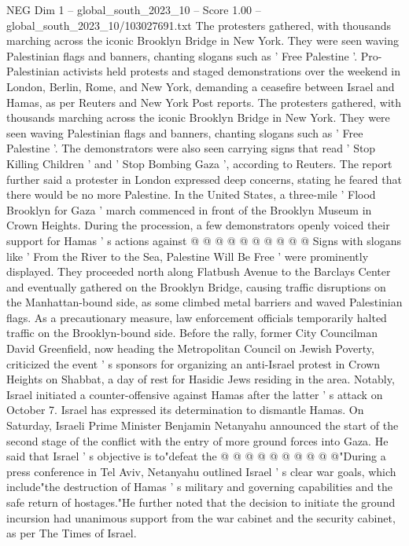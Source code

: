 \begin{textsample}{NEG Dim 1 – global\_south\_2023\_10 – Score 1.00 – global\_south\_2023\_10/103027691.txt}  \label{ex:f1_neg_406}
The protesters gathered, with thousands marching across the iconic Brooklyn Bridge in New York.
They were seen waving Palestinian flags and banners, chanting slogans such as ' Free Palestine '.
Pro-Palestinian activists held protests and staged demonstrations over the weekend in London, Berlin, Rome, and New York, demanding a ceasefire between Israel and Hamas, as per Reuters and New York Post reports.
The protesters gathered, with thousands marching across the iconic Brooklyn Bridge in New York.
They were seen waving Palestinian flags and banners, chanting slogans such as ' Free Palestine '.
The demonstrators were also seen carrying signs that read ' Stop Killing Children ' and ' Stop Bombing Gaza ', according to Reuters.
The report further said a protester in London expressed deep concerns, stating he feared that there would be no more Palestine.
In the United States, a three-mile ' Flood Brooklyn for Gaza ' march commenced in front of the Brooklyn Museum in Crown Heights.
During the procession, a few demonstrators openly voiced their support for Hamas ' s actions against @ @ @ @ @ @ @ @ @ @ Signs with slogans like ' From the River to the Sea, Palestine Will Be Free ' were prominently displayed.
They proceeded north along Flatbush Avenue to the Barclays Center and eventually gathered on the Brooklyn Bridge, causing traffic disruptions on the Manhattan-bound side, as some climbed metal barriers and waved Palestinian flags.
As a precautionary measure, law enforcement officials temporarily halted traffic on the Brooklyn-bound side.
Before the rally, former City Councilman David Greenfield, now heading the Metropolitan Council on Jewish Poverty, criticized the event ' s sponsors for organizing an anti-Israel protest in Crown Heights on Shabbat, a day of rest for Hasidic Jews residing in the area.
Notably, Israel initiated a counter-offensive against Hamas after the latter ' s attack on October 7.
Israel has expressed its determination to dismantle Hamas.
On Saturday, Israeli Prime Minister Benjamin Netanyahu announced the start of the second stage of the conflict with the entry of more ground forces into Gaza.
He said that Israel ' s objective is to"defeat the @ @ @ @ @ @ @ @ @ @"During a press conference in Tel Aviv, Netanyahu outlined Israel ' s clear war goals, which include"the destruction of Hamas ' s military and governing capabilities and the safe return of hostages."He further noted that the decision to initiate the ground incursion had unanimous support from the war cabinet and the security cabinet, as per The Times of Israel.

\end{textsample}
